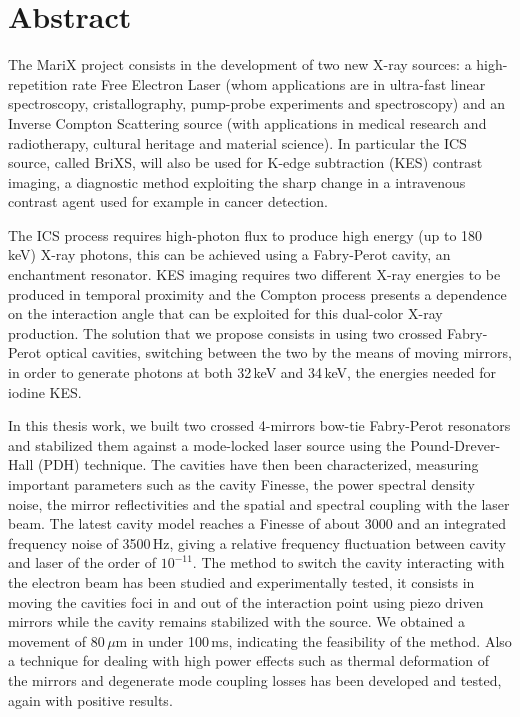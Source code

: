 \chapter*{Abstract}

The MariX project consists in the development of two new X-ray sources: a high-repetition rate Free Electron Laser (whom applications are in ultra-fast linear spectroscopy, cristallography, pump-probe experiments and spectroscopy) and an Inverse Compton Scattering source (with applications in medical research and radiotherapy, cultural heritage and material science). In particular the ICS source, called BriXS, will also be used for K-edge subtraction (KES) contrast imaging, a diagnostic method exploiting the sharp change in a intravenous contrast agent used for example in cancer detection.

The ICS process requires high-photon flux to produce high energy (up to 180\,keV) X-ray photons, this can be achieved using a Fabry-Perot cavity, an enchantment resonator. KES imaging requires two different X-ray energies to be produced in temporal proximity and the Compton process presents a dependence on the interaction angle that can be exploited for this dual-color X-ray production. The solution that we propose consists in using two crossed Fabry-Perot optical cavities, switching between the two by the means of moving mirrors, in order to generate photons at both 32\,keV and 34\,keV, the energies needed for iodine KES.

In this thesis work, we built two crossed 4-mirrors bow-tie Fabry-Perot resonators and stabilized them against a mode-locked laser source using the Pound-Drever-Hall (PDH) technique. The cavities have then been characterized, measuring important parameters such as the cavity Finesse, the power spectral density noise, the mirror reflectivities and the spatial and spectral coupling with the laser beam. The latest cavity model reaches a Finesse of about 3000 and an integrated frequency noise of 3500\,Hz, giving a relative frequency fluctuation between cavity and laser of the order of $10^{-11}$. The method to switch the cavity interacting with the electron beam has been studied and experimentally tested, it consists in moving the cavities foci in and out of the interaction point using piezo driven mirrors while the cavity remains stabilized with the source. We obtained a movement of 80\,$\mu$m in under 100\,ms, indicating the feasibility of the method. Also a technique for dealing with high power effects such as thermal deformation of the mirrors and degenerate mode coupling losses has been developed and tested, again with positive results.

